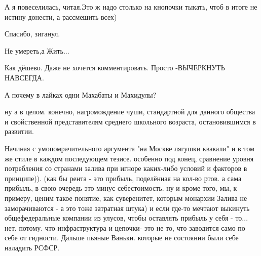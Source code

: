 \begin{itemize}
 
А я повеселилась, читая.\Smiley[1.0][yellow] Это ж надо столько на кнопочки тыкать, чтоб в итоге не истину донести, а рассмешить всех)

 
Спасибо, зиганул.

 
Не умереть,а Жить...

 
Как дёшево. Даже не хочется комментировать. Просто -ВЫЧЕРКНУТЬ НАВСЕГДА.

 
А почему в лайках одни Махабаты и Махидулы?

 

ну а в целом. конечно, нагромождение чуши, стандартной для данного общества и
свойственной представителям среднего школьного возраста, остановившимся в
развитии. 

Начиная с умопомрачительного аргумента "на Москве лягушки квакали" и
в том же стиле в каждом последующем тезисе. особенно под конец, сравнение
уровня потребления со странами залива при игноре каких-либо условий и факторов
в принципе)). (как бы рента - это прибыль, поделённая на кол-во ртов. а сама
прибыль, в свою очередь это минус себестоимость. ну и кроме того, мы, к
примеру, ценим такое понятие, как суверенитет, которым монархии Залива не
заморачиваются - а это тоже затратная штука) и если где-то мечтают выкинуть
общефедеральные компании из улусов, чтобы оставлять прибыль у себя - то... нет.
потому. что инфраструктура и цепочки- это не то, что заводится само по себе от
гидности. Дальше пьяные Ваньки. которые не состоянии были себе наладить РСФСР.


\end{itemize}
